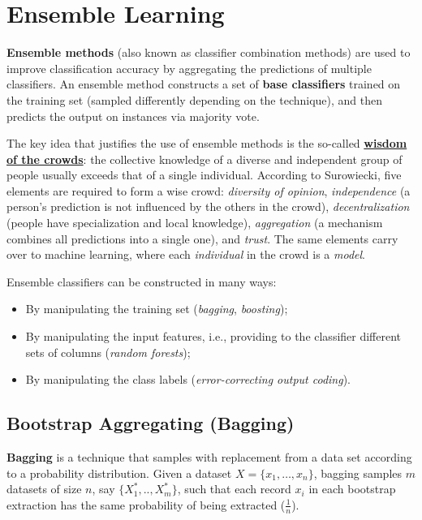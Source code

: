 \section{Ensemble Learning}
\begin{definition}
\textbf{Ensemble methods} (also known as classifier combination methods) are used to improve classification accuracy by aggregating the predictions of multiple classifiers. An ensemble method constructs a set of \textbf{base classifiers} trained on the training set (sampled differently depending on the technique), and then predicts the output on instances via majority vote.
\end{definition}
The key idea that justifies the use of ensemble methods is the so-called \hyperlink{https://en.wikipedia.org/wiki/The_Wisdom_of_Crowds}{\textbf{wisdom of the crowds}}: the collective knowledge of a diverse and independent group of people usually exceeds that of a single individual. According to Surowiecki, five elements are required to form a wise crowd: \textit{diversity of opinion}, \textit{independence} (a person's prediction is not influenced by the others in the crowd), \textit{decentralization} (people have specialization and local knowledge), \textit{aggregation} (a mechanism combines all predictions into a single one), and \textit{trust}. The same elements carry over to machine learning, where each \textit{individual} in the crowd is a \textit{model}.

Ensemble classifiers can be constructed in many ways:
\begin{itemize}
    \item By manipulating the training set (\textit{bagging}, \textit{boosting});
    \item By manipulating the input features, i.e., providing to the classifier different sets of columns (\textit{random forests});
    \item By manipulating the class labels (\textit{error-correcting output coding}).
\end{itemize}

\subsection{Bootstrap Aggregating (Bagging)}
\textbf{Bagging} is a technique that samples with replacement from a data set according to a probability distribution. Given a dataset $X = \{x_1, \dots, x_n \}$, bagging samples $m$ datasets of size $n$, say $\{X_1^*,..,X_m^*\}$, such that each record $x_i$ in each bootstrap extraction has the same probability of being extracted ($\frac{1}{n}$).

